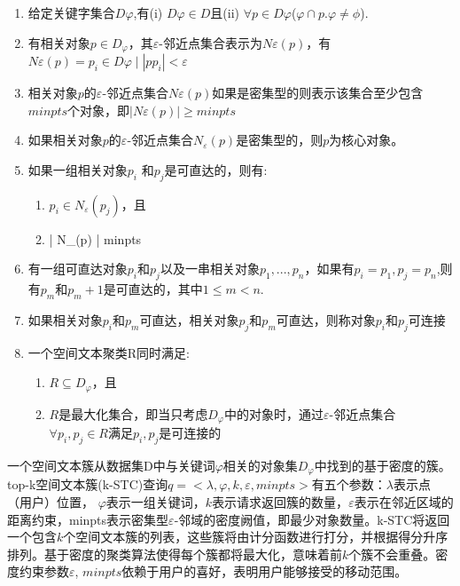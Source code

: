 \begin{enumerate}[labelwidth=1.5cm,labelindent=10pt,leftmargin=2.2cm,label=\bfseries{ 定义 \arabic*:},align=left]
	\setcounter{enumi}{0}%
	
  \item 给定关键字集合$D\varphi$,有(i) $D\varphi \in D$且(ii) $\forall p \in D\varphi$($\varphi \cap p. \varphi\neq\phi$).
  \item 有相关对象$p \in D_{\varphi}$，其$\varepsilon$-邻近点集合表示为$N\varepsilon(p)$，有$N\varepsilon(p) = { p_{i}\in D\varphi \mid \left| pp_{i}\right| < \varepsilon }$
  \item 相关对象$p$的$ \varepsilon $-邻近点集合$N \varepsilon (p)$如果是密集型的则表示该集合至少包含$minpts$个对象，即$\left| N \varepsilon (p) \right| \geq minpts$
  \item 如果相关对象$p$的$\varepsilon$-邻近点集合$N_{\varepsilon}(p)$是密集型的，则$p$为核心对象。
  \item 如果一组相关对象$p_{i}$ 和$p_{j}$是可直达的，则有: 
  \begin{enumerate}
		\item $p_{i} \in  N_{\varepsilon}(p_{j})$，且
		\item \left| N_{\varepsilon}(p) \right| \geq minpts
	\end{enumerate}
	
	\item 有一组可直达对象$p_{i}$和$p_{j}$以及一串相关对象$p_{1}, ..., p_{n}$，如果有$p_{i} = p_{1}, p_{j} = p_{n}$,则有$p_{m}和p_{m}+1$是可直达的，其中$1 \leq m < n.$ 

	\item 如果相关对象$p_{i}$和$p_{m}$可直达，相关对象$p_{j}$和$p_{m}$可直达，则称对象$p_{i}$和$p_{j}$可连接

	\item 一个空间文本聚类R同时满足: 
	\begin{enumerate}
		\item $R \subseteq D_{\varphi}$，且
		\item $R$是最大化集合，即当只考虑$D_{\varphi}$中的对象时，通过$\varepsilon$-邻近点集合$\forall p_{i},p_{j} \in R$满足$p_{i},p_{j}$是可连接的
	\end{enumerate}

\end{enumerate}

一个空间文本簇从数据集D中与关键词$\varphi$相关的对象集$D_{\varphi}$中找到的基于密度的簇。top-k空间文本簇(k-STC)查询$q =<\lambda, \varphi, k, \varepsilon, minpts>$有五个参数：$\lambda$表示点（用户）位置， $\varphi$表示一组关键词，$k$表示请求返回簇的数量，$\varepsilon$表示在邻近区域的距离约束，minpts表示密集型$\varepsilon$-邻域的密度阙值，即最少对象数量。k-STC将返回一个包含$k$个空间文本簇的列表，这些簇将由计分函数进行打分，并根据得分升序排列。基于密度的聚类算法使得每个簇都将最大化，意味着前$k$个簇不会重叠。密度约束参数$\varepsilon$, $minpts$依赖于用户的喜好，表明用户能够接受的移动范围。

